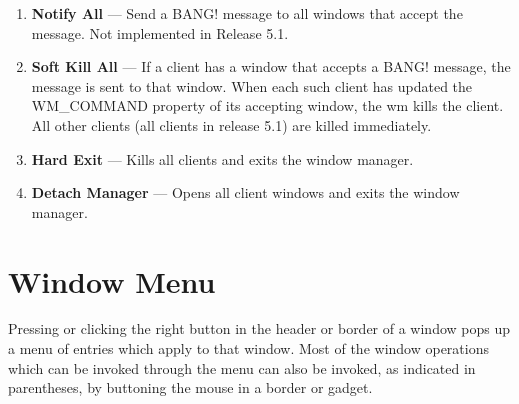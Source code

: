 \begin{enumerate}
When ``{\bf Finish Layout}'' does not appear, ``{\bf Save Layout}'' appears in
its place.
Selecting ``{\bf Save Layout}'' saves information about all open and closed
windows and their icons in {\bf .rtl.layout}.


\item {\bf Notify All} --- Send a {\sc BANG!} message to all windows that accept the
message.
Not implemented in Release 5.1.

\item {\bf Soft Kill All} --- If a client has a window that accepts a {\sc BANG!}
message, the message is sent to that window.
When each such client has updated the {\sc WM\_COMMAND} property of its
accepting window, the wm kills the client.  All other clients (all
clients in release 5.1) are killed immediately.

\item {\bf Hard Exit} --- Kills all clients and exits the window manager.

\item {\bf Detach Manager} --- Opens all client windows and exits the
window manager.
\end{enumerate}

\section{Window Menu}

Pressing or clicking the right button in the header or border of a window
pops up a menu of entries which apply to that window.
Most of the window operations which can be invoked through the menu can
also be invoked, as indicated in parentheses, by buttoning the mouse in a
border or gadget.


